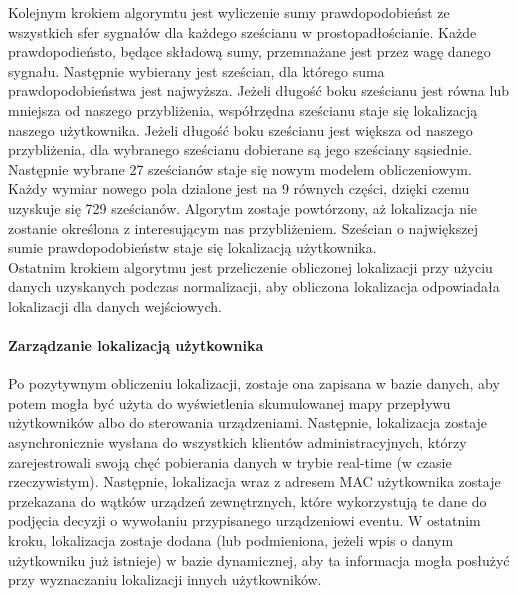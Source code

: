 \documentclass{article}
\begin{document}
		Kolejnym krokiem algorymtu jest wyliczenie sumy prawdopodobieńst ze wszystkich sfer sygnałów dla każdego sześcianu w prostopadłościanie. Każde prawdopodieństo, będące składową sumy, przemnażane jest przez wagę danego sygnału. Następnie wybierany jest sześcian, dla którego suma prawdopodobieństwa jest najwyższa. Jeżeli długość boku sześcianu jest równa lub mniejsza od naszego przybliżenia, współrzędna sześcianu staje się lokalizacją naszego użytkownika. Jeżeli długość boku sześcianu jest większa od naszego przybliżenia, dla wybranego sześcianu dobierane są jego sześciany sąsiednie. Następnie wybrane 27 sześcianów staje się nowym modelem obliczeniowym. Każdy wymiar nowego pola dzialone jest na 9 równych części, dzięki czemu uzyskuje się 729 sześcianów. Algorytm zostaje powtórzony, aż lokalizacja nie zostanie określona z interesującym nas przybliżeniem. Sześcian o największej sumie prawdopodobieństw staje się lokalizacją użytkownika.\\
		Ostatnim krokiem algorytmu jest przeliczenie obliczonej lokalizacji przy użyciu danych uzyskanych podczas normalizacji, aby obliczona lokalizacja odpowiadała lokalizacji dla danych wejściowych.
		\paragraph{Zarządzanie lokalizacją użytkownika}
		Po pozytywnym obliczeniu lokalizacji, zostaje ona zapisana w bazie danych, aby potem mogła być użyta do wyświetlenia skumulowanej mapy przepływu użytkowników albo do sterowania urządzeniami. Następnie, lokalizacja zostaje asynchronicznie wysłana do wszystkich klientów administracyjnych, którzy zarejestrowali swoją chęć pobierania danych w trybie real-time (w czasie rzeczywistym). Następnie, lokalizacja wraz z adresem MAC użytkownika zostaje przekazana do wątków urządzeń zewnętrznych, które wykorzystują te dane do podjęcia decyzji o wywołaniu przypisanego urządzeniowi eventu. W ostatnim kroku, lokalizacja zostaje dodana (lub podmieniona, jeżeli wpis o danym użytkowniku już istnieje) w bazie dynamicznej, aby ta informacja mogła posłużyć przy wyznaczaniu lokalizacji innych użytkowników.
		
		
\end{document}
